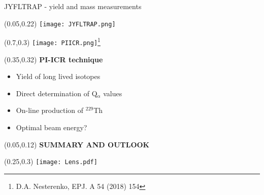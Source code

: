 \documentclass[10pt,aspectratio=169]{beamer}
\begin{document}
\begin{frame}{\qquad JYFLTRAP - yield and mass measurements}
	\begin{textblock*}{0.3\paperwidth}(0.05\paperwidth,0.22\paperheight)
		\texttt{[image: JYFLTRAP.png]}
	\end{textblock*}
	\begin{textblock*}{0.25\paperwidth}(0.7\paperwidth,0.3\paperheight)
		\texttt{[image: PIICR.png]}\footnote{D.A. Nesterenko, EPJ. A 54 (2018) 154}
	\end{textblock*}
	\begin{textblock*}{0.3\paperwidth}(0.35\paperwidth,0.32\paperheight)
		\centering
		\textbf{PI-ICR technique}
		\begin{itemize}
			\item Yield of long lived isotopes
			\item Direct determination of Q$_{\alpha}$ values
			\item On-line production of $^{229}$Th
			\item Optimal beam energy?
		\end{itemize}
	\end{textblock*}
\end{frame}

\begin{SectionTitle}
	\begin{frame}
		\centering
		\begin{textblock*}{0.9\paperwidth}(0.05\paperwidth,0.12\paperheight)
			\centering
			\textbf{\LARGE SUMMARY AND OUTLOOK}	
		\end{textblock*}
		\begin{textblock*}{0.5\paperwidth}(0.25\paperwidth,0.3\paperheight)
			\texttt{[image: Lens.pdf]}
		\end{textblock*}
	\end{frame}
\end{SectionTitle}
\end{document}
